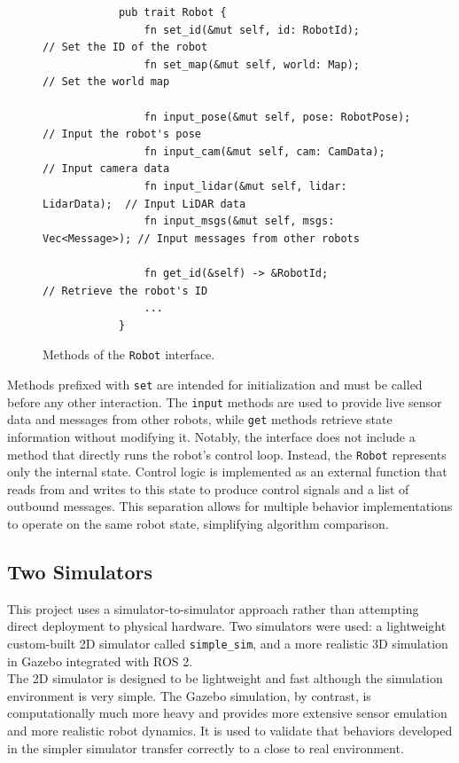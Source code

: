 \begin{figure}[H]
    \begin{center}
        \begin{verbatim}
            pub trait Robot {
                fn set_id(&mut self, id: RobotId);            // Set the ID of the robot
                fn set_map(&mut self, world: Map);            // Set the world map

                fn input_pose(&mut self, pose: RobotPose);    // Input the robot's pose
                fn input_cam(&mut self, cam: CamData);        // Input camera data
                fn input_lidar(&mut self, lidar: LidarData);  // Input LiDAR data
                fn input_msgs(&mut self, msgs: Vec<Message>); // Input messages from other robots

                fn get_id(&self) -> &RobotId;                 // Retrieve the robot's ID
                ...
            }
        \end{verbatim}
    \end{center}
    \caption{Methods of the \texttt{Robot} interface.}
    \label{fig:robot-interface}
\end{figure}

Methods prefixed with \texttt{set} are intended for initialization and must be called before any other interaction. The \texttt{input} methods are used to provide live sensor data and messages from other robots, while \texttt{get} methods retrieve state information without modifying it. Notably, the interface does not include a method that directly runs the robot’s control loop. Instead, the \texttt{Robot} represents only the internal state. Control logic is implemented as an external function that reads from and writes to this state to produce control signals and a list of outbound messages. This separation allows for multiple behavior implementations to operate on the same robot state, simplifying algorithm comparison.

\subsection{Two Simulators}
This project uses a simulator-to-simulator approach rather than attempting direct deployment to physical hardware. Two simulators were used: a lightweight custom-built 2D simulator called \texttt{simple\_sim}, and a more realistic 3D simulation in Gazebo integrated with ROS 2. \\

The 2D simulator is designed to be lightweight and fast although the simulation environment is very simple. The Gazebo simulation, by contrast, is computationally much more heavy and provides more extensive sensor emulation and more realistic robot dynamics. It is used to validate that behaviors developed in the simpler simulator transfer correctly to a close to real environment. \\


